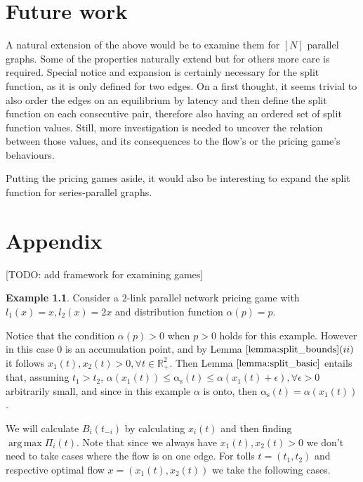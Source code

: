 \documentclass[10pt,a4paper]{book}
\newcommand{\as}{\mathrm{\alpha_s}}
\newcommand{\R}{\mathbb{R}}
\DeclareMathOperator*{\argmax}{arg\,max}
\theoremstyle{definition}
\theoremstyle{comment}
\newtheorem{example}[definition]{Example}
\begin{document}
\cleardoublepage


\chapter{Future work}

A natural extension of the above would be to examine them for $[N]$ parallel graphs.
Some of the properties naturally extend but for others more care is required.
Special notice and expansion is certainly necessary for the split function, as it is only defined for two edges.
On a first thought, it seems trivial to also order the edges on an equilibrium by latency and then define the split function on each consecutive pair, therefore also having an ordered set of split function values.
Still, more investigation is needed to uncover the relation between those values, and its consequences to the flow's or the pricing game's behaviours.

Putting the pricing games aside, it would also be interesting to expand the split function for series-parallel graphs.

\cleardoublepage

{}


\cleardoublepage

{}
\chapter*{Appendix}

[TODO: add framework for examining games]

\begin{example}
	\label{example:ap_p}
	Consider a $2$-link parallel network pricing game with $l_1(x) = x, l_2(x) = 2x$ and distribution function $\alpha(p) = p$.
\end{example}

Notice that the condition $\alpha(p) > 0$ when $p > 0$ holds for this example.
However in this case $0$ is an accumulation point, and by Lemma $\ref{lemma:split_bounds}(ii)$ it follows $x_1(t), x_2(t) > 0, \forall t \in \R_+^2$.
Then Lemma $\ref{lemma:split_basic}$ entails that, assuming $t_1 > t_2$, $\alpha(x_1(t)) \le \as(t) \le \alpha(x_1(t) + \epsilon), \forall \epsilon > 0$ arbitrarily small, and since in this example $\alpha$ is onto, then $\as(t) = \alpha(x_1(t))$.

We will calculate $B_i(t_{-i})$ by calculating $x_i(t)$ and then finding $\argmax \Pi_i(t)$.
Note that since we always have $x_1(t), x_2(t) > 0$ we don't need to take cases where the flow is on one edge.
For tolls $t = (t_1, t_2)$ and respective optimal flow $x = (x_1(t), x_2(t))$ we take the following cases.
\end{document}

